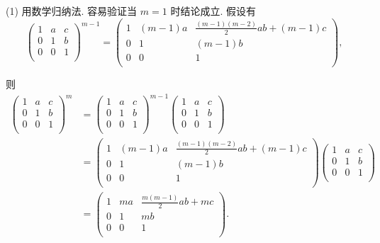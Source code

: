 \documentclass[color=black,device=normal,lang=cn,mode=geye]{elegantnote}
\begin{document}
\begin{solution}
    (1) 用数学归纳法. 容易验证当 $m=1$ 时结论成立. 假设有
    \[\begin{pmatrix}
        1 & a & c \\
        0 & 1 & b \\
        0 & 0 & 1 \\
    \end{pmatrix}^{m-1}=\begin{pmatrix}
        1 & (m-1)a & \frac{(m-1)(m-2)}{2}ab+(m-1)c \\
        0 & 1 & (m-1)b \\
        0 & 0 & 1 \\
    \end{pmatrix},\]

    则
    \begin{align*}
        \begin{pmatrix}
            1 & a & c \\
            0 & 1 & b \\
            0 & 0 & 1 \\
        \end{pmatrix}^m & =\begin{pmatrix}
            1 & a & c \\
            0 & 1 & b \\
            0 & 0 & 1 \\
        \end{pmatrix}^{m-1}\begin{pmatrix}
            1 & a & c \\
            0 & 1 & b \\
            0 & 0 & 1 \\
        \end{pmatrix} \\
        & =\begin{pmatrix}
            1 & (m-1)a & \frac{(m-1)(m-2)}{2}ab+(m-1)c \\
            0 & 1 & (m-1)b \\
            0 & 0 & 1 \\
        \end{pmatrix}\begin{pmatrix}
            1 & a & c \\
            0 & 1 & b \\
            0 & 0 & 1 \\
        \end{pmatrix} \\
        & =\begin{pmatrix}
            1 & ma & \frac{m(m-1)}{2}ab+mc \\
            0 & 1 & mb \\
            0 & 0 & 1 \\
        \end{pmatrix}.
    \end{align*}


\end{solution}
\end{document}
